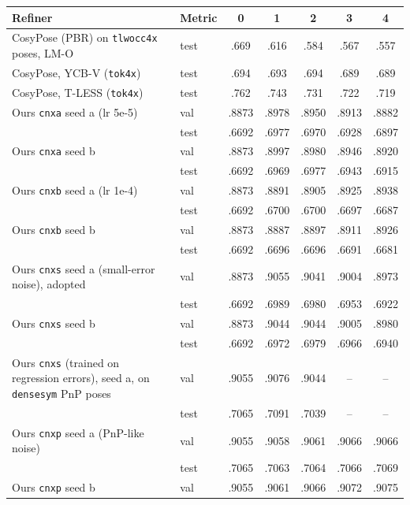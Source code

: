 \begin{table}[t]
  \centering
  \small
  \begin{tabular}{@{}llccccc@{}}
    \toprule
    Refiner & Metric & 0 & 1 & 2 & 3 & 4 \\
    \midrule
    CosyPose (PBR) on \texttt{tlwocc4x} poses, LM-O & test & .669 & .616 & .584 & .567 & .557 \\
    CosyPose, YCB-V (\texttt{tok4x}) & test & .694 & .693 & .694 & .689 & .689 \\
    CosyPose, T-LESS (\texttt{tok4x}) & test & .762 & .743 & .731 & .722 & .719 \\
    Ours \texttt{cnxa} seed a (lr 5e-5) & val & .8873 & .8978 & .8950 & .8913 & .8882 \\
     & test & .6692 & .6977 & .6970 & .6928 & .6897 \\
    Ours \texttt{cnxa} seed b & val & .8873 & .8997 & .8980 & .8946 & .8920 \\
     & test & .6692 & .6969 & .6977 & .6943 & .6915 \\
    Ours \texttt{cnxb} seed a (lr 1e-4) & val & .8873 & .8891 & .8905 & .8925 & .8938 \\
     & test & .6692 & .6700 & .6700 & .6697 & .6687 \\
    Ours \texttt{cnxb} seed b & val & .8873 & .8887 & .8897 & .8911 & .8926 \\
     & test & .6692 & .6696 & .6696 & .6691 & .6681 \\
    Ours \texttt{cnxs} seed a (small-error noise), adopted & val & .8873 & .9055 & .9041 & .9004 & .8973 \\
     & test & .6692 & .6989 & .6980 & .6953 & .6922 \\
    Ours \texttt{cnxs} seed b & val & .8873 & .9044 & .9044 & .9005 & .8980 \\
     & test & .6692 & .6972 & .6979 & .6966 & .6940 \\
    \midrule
    Ours \texttt{cnxs} (trained on regression errors), seed a, on \texttt{densesym} PnP poses & val & .9055 & .9076 & .9044 & -- & -- \\
     & test & .7065 & .7091 & .7039 & -- & -- \\
    Ours \texttt{cnxp} seed a (PnP-like noise) & val & .9055 & .9058 & .9061 & .9066 & .9066 \\
     & test & .7065 & .7063 & .7064 & .7066 & .7069 \\
    Ours \texttt{cnxp} seed b & val & .9055 & .9061 & .9066 & .9072 & .9075 \\

\end{tabular}
\end{table}
